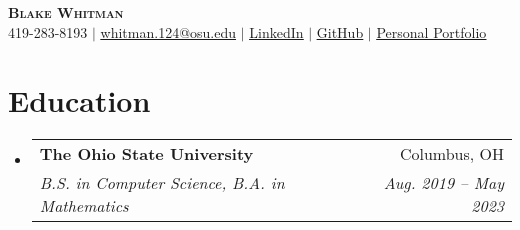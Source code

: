 \documentclass[letterpaper,11pt]{article}
\makeatletter
\newcommand{\resumeSubheading}[4]{
  \vspace{-2pt}\item
    \begin{tabular*}{0.97\textwidth}[t]{l@{\extracolsep{\fill}}r}
      \textbf{#1} & #2 \\
      \textit{\small#3} & \textit{\small #4} \\
    \end{tabular*}\vspace{-7pt}
}
\newcommand{\resumeSubHeadingListStart}{\begin{itemize}[leftmargin=0.15in, label={}]}
\newcommand{\resumeSubHeadingListEnd}{\end{itemize}}
\makeatother
\begin{document}

\begin{center}
    \textbf{\Huge \scshape Blake Whitman} \\ \vspace{3pt}
    \small 419-283-8193 \hspace{.01cm} $|$ \hspace{.01cm} \href{mailto:whitman.124@osu.edu}{\underline{whitman.124@osu.edu}} \hspace{.01cm} $|$ \hspace{.01cm} 
    \href{https://www.linkedin.com/in/blake-whitman-85301b1a4/}{\underline{LinkedIn}} \hspace{.01cm} $|$ \hspace{.01cm}
    \href{https://github.com/blake-whitman}{\underline{GitHub}}
    \hspace{.01cm} $|$ \hspace{.01cm}
    \href{https://blake-whitman.github.io}{\underline{Personal Portfolio}}
\end{center}


\section{Education}
  \resumeSubHeadingListStart
    \resumeSubheading
      {The Ohio State University}{Columbus, OH}
      {B.S. in Computer Science, B.A. in Mathematics}{Aug. 2019 -- May 2023}
  \resumeSubHeadingListEnd
\end{document}
